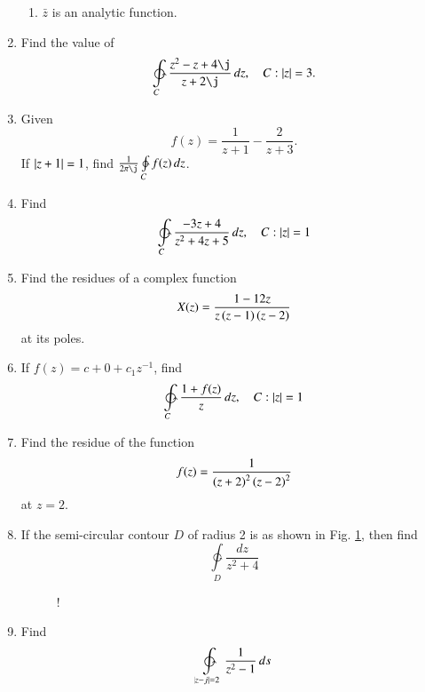 \documentclass[journal,12pt,twocolumn]{IEEEtran}
\begin{document}
\begin{enumerate}[1.]
\begin{enumerate}
\item $\bar{z}$ is an analytic function.
\end{enumerate}
\item Find the value of 
\begin{equation}
\ointctrclockwise\limits_{C}\frac{z^2-z+4\j}{z+2\j}\,dz, \quad C:\abs{z} = 3.
\end{equation}
\item Given 
\begin{equation}
f(z) = \frac{1}{z+1}-\frac{2}{z+3}.
\end{equation}
%
If $\left\vert z+1\right\vert = 1 $, find $\frac{1}{2\pi\j}\ointctrclockwise\limits_{C}f(z)\,dz$.
\item Find 
\begin{equation}
\ointctrclockwise\limits_{C}\frac{-3z+4}{z^2+4z+5}\,dz, \quad C:\abs{z} = 1
\end{equation}
\item Find the residues of a complex function 
\begin{equation}
X(z) = \frac{1-12z}{z\left(z-1\right)\left(z-2\right)}
\end{equation}
at its poles.
\item If $f(z) = c+0+c_1z^{-1}$, find
\begin{equation}
\ointctrclockwise\limits_{C}\frac{1+f(z)}{z}\,dz, \quad C: \abs{z} = 1
\end{equation} 
\item Find the residue of the function
\begin{equation}
f(z) = \frac{1}{\left(z+2\right)^2\left(z-2\right)^2}
\end{equation}
at $z = 2$.
\item If the semi-circular contour $D$ of radius 2 is as shown in Fig. \ref{fig:ec2007}, then find
\begin{equation}
\ointctrclockwise\limits_{D}\frac{dz}{z^2+4}
\end{equation}

\begin{figure}[!h]
\centering
\resizebox {\columnwidth} {!} {

}
\caption{}
\label{fig:ec2007}
\end{figure}

\item Find
\begin{equation}
\ointctrclockwise\limits_{\abs{z-j}=2}\frac{1}{z^2-1}\,ds
\end{equation}


\end{enumerate}
\end{document}
